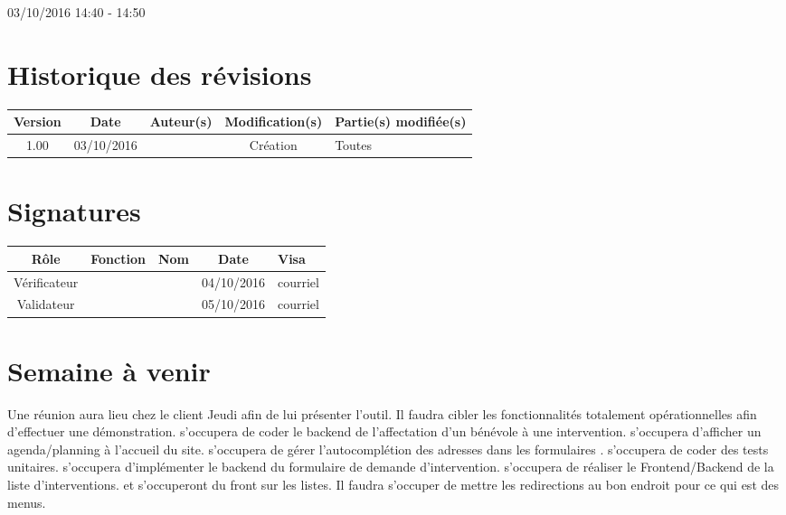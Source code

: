 \documentclass [a4paper] {article}
\begin{document}
03/10/2016			 				%
\hfill   
\hfill 	 14:40 - 14:50				%



\section*{Historique des révisions}
\begin{center}
			\begin{tabular}{| c | c | c | c | p{4cm} |}
				\hline
				\rowcolor{Gray}
				Version & Date & Auteur(s) & Modification(s) & Partie(s) modifiée(s)		 \\
				\hline
				1.00 & 03/10/2016 & \Kafui & Création & Toutes \\
		\hline		
			\end{tabular}
		\end{center}

\section*{Signatures}

		\begin{center}
			\begin{tabular}{| c | c | c | c | p{4cm} |}
				\hline
				\rowcolor{Gray}
				Rôle & Fonction & Nom & Date & Visa		 \\
				\hline
				Vérificateur & \RQ & \Melissa & 04/10/2016 & courriel \\[30pt]
				\hline
				Validateur & \CP & \Pierre & 05/10/2016 & courriel \\[30pt]	
				\hline
			\end{tabular}
		\end{center}

\section{Semaine à venir}
Une réunion aura lieu chez le client Jeudi afin de lui présenter l'outil. Il faudra cibler les fonctionnalités totalement opérationnelles afin d'effectuer une démonstration.
\Julie{} s'occupera de coder le backend de l'affectation d'un bénévole à une intervention. \Melissa{} s'occupera d'afficher un agenda/planning à l'accueil du site. \Florian{} s'occupera de gérer l'autocomplétion des adresses dans les formulaires .
\Matthieu{} s'occupera de coder des tests unitaires.
\Kafui{} s'occupera d'implémenter le backend du formulaire de demande d'intervention. \Julie{} s'occupera de réaliser le Frontend/Backend de la liste d'interventions.
\Francois{} et \Juliana{} s'occuperont du front sur les listes.
Il faudra s'occuper de mettre les redirections au bon endroit pour ce qui est des menus.





\end{document}
